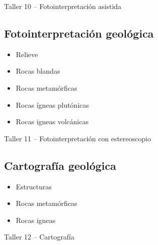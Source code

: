 \documentclass[a4paper,twoside,11pt,]{article}
\begin{document}
\begin{tcolorbox}[enhanced,width=5in,center upper,  fontupper=\large\bfseries,drop shadow southwest,sharp corners]
Taller 10 -- Fotointerpretación asistida
\end{tcolorbox}

\subsection {Fotointerpretación geológica}
\begin{itemize}
\item Relieve
\item Rocas blandas
\item Rocas metamórficas
\item Rocas ígneas plutónicas
\item Rocas igneas volcánicas
\end{itemize}

\begin{tcolorbox}[enhanced,width=5in,center upper,  fontupper=\large\bfseries,drop shadow southwest,sharp corners]
Taller 11 -- Fotointerpretación con estereoscopio
\end{tcolorbox}

\subsection {Cartografía geológica}
\begin{itemize}
\item Estructuras
\item Rocas metamórficas
\item Rocas igneas
\end{itemize}

\begin{tcolorbox}[enhanced,width=5in,center upper,  fontupper=\large\bfseries,drop shadow southwest,sharp corners]
Taller 12 -- Cartografía
\end{tcolorbox}
\end{document}
